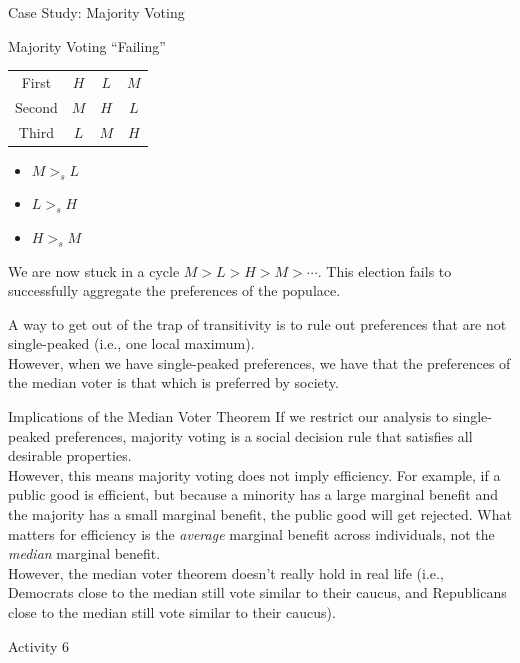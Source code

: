 \documentclass[8pt]{extarticle}
\begin{document}
\begin{problem}{Case Study: Majority Voting}
\begin{problem}{Majority Voting ``Failing''}
\begin{center}
\begin{tabular}{c|c|c|c|}
          \cline{2-4}
          First & $H$ & $L$ & $M$\\
          \cline{2-4}
          Second & $M$ & $H$ & $L$\\
          \cline{2-4}
          Third & $L$ & $M$ & $H$\\
          \cline{2-4}
        \end{tabular}
      \end{center}
      \begin{itemize}
        \item $M >_s L$
        \item $L >_s H$
        \item $H >_s M$
      \end{itemize}
      We are now stuck in a cycle $M>L>H>M>\cdots$. This election fails to successfully aggregate the preferences of the populace.
    \end{problem}
    A way to get out of the trap of transitivity is to rule out preferences that are not single-peaked (i.e., one local maximum).\\

    However, when we have single-peaked preferences, we have that the preferences of the median voter is that which is preferred by society.
  \end{problem}
  \begin{problem}{Implications of the Median Voter Theorem}
    If we restrict our analysis to single-peaked preferences, majority voting is a social decision rule that satisfies all desirable properties.\\

    However, this means majority voting does not imply efficiency. For example, if a public good is efficient, but because a minority has a large marginal benefit and the majority has a small marginal benefit, the public good will get rejected. What matters for efficiency is the \textit{average} marginal benefit across individuals, not the \textit{median} marginal benefit.\\

    However, the median voter theorem doesn't really hold in real life (i.e., Democrats close to the median still vote similar to their caucus, and Republicans close to the median still vote similar to their caucus).
  \end{problem}
  \begin{problem}{Activity 6}
    \begin{tcbraster}[raster columns = 1,colframe = black!75!white,colback=white]
    \end{tcbraster}
  \end{problem}
\end{document}
